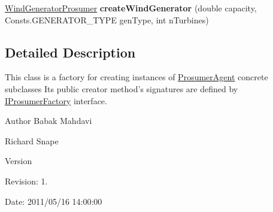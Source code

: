 \begin{DoxyCompactItemize}
\item 
\hypertarget{classuk_1_1ac_1_1dmu_1_1iesd_1_1cascade_1_1agents_1_1prosumers_1_1_prosumer_factory_a5a6d3b2a83676091527d47b200096338}{\hyperlink{classuk_1_1ac_1_1dmu_1_1iesd_1_1cascade_1_1agents_1_1prosumers_1_1_wind_generator_prosumer}{Wind\-Generator\-Prosumer} {\bfseries create\-Wind\-Generator} (double capacity, Consts.\-G\-E\-N\-E\-R\-A\-T\-O\-R\-\_\-\-T\-Y\-P\-E gen\-Type, int n\-Turbines)}\label{classuk_1_1ac_1_1dmu_1_1iesd_1_1cascade_1_1agents_1_1prosumers_1_1_prosumer_factory_a5a6d3b2a83676091527d47b200096338}

\end{DoxyCompactItemize}


\subsection{Detailed Description}
This class is a factory for creating instances of {\ttfamily \hyperlink{classuk_1_1ac_1_1dmu_1_1iesd_1_1cascade_1_1agents_1_1prosumers_1_1_prosumer_agent}{Prosumer\-Agent}} concrete subclasses Its public creator method's signatures are defined by \hyperlink{interfaceuk_1_1ac_1_1dmu_1_1iesd_1_1cascade_1_1agents_1_1prosumers_1_1_i_prosumer_factory}{I\-Prosumer\-Factory} interface. 

\begin{DoxyAuthor}{Author}
Babak Mahdavi 

Richard Snape 
\end{DoxyAuthor}
\begin{DoxyVersion}{Version}

\end{DoxyVersion}
\begin{DoxyParagraph}{Revision\-:}
1. 
\end{DoxyParagraph}
\begin{DoxyParagraph}{Date\-:}
2011/05/16 14\-:00\-:00 
\end{DoxyParagraph}


